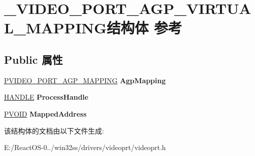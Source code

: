 \hypertarget{struct___v_i_d_e_o___p_o_r_t___a_g_p___v_i_r_t_u_a_l___m_a_p_p_i_n_g}{}\section{\+\_\+\+V\+I\+D\+E\+O\+\_\+\+P\+O\+R\+T\+\_\+\+A\+G\+P\+\_\+\+V\+I\+R\+T\+U\+A\+L\+\_\+\+M\+A\+P\+P\+I\+N\+G结构体 参考}
\label{struct___v_i_d_e_o___p_o_r_t___a_g_p___v_i_r_t_u_a_l___m_a_p_p_i_n_g}
\subsection*{Public 属性}
\begin{DoxyCompactItemize}
\item 
\mbox{\label{struct___v_i_d_e_o___p_o_r_t___a_g_p___v_i_r_t_u_a_l___m_a_p_p_i_n_g_adacc8568ab3f0f2904dcaee8b2c81306}} 
\hyperlink{struct___v_i_d_e_o___p_o_r_t___a_g_p___m_a_p_p_i_n_g}{P\+V\+I\+D\+E\+O\+\_\+\+P\+O\+R\+T\+\_\+\+A\+G\+P\+\_\+\+M\+A\+P\+P\+I\+NG} {\bfseries Agp\+Mapping}
\item 
\mbox{\label{struct___v_i_d_e_o___p_o_r_t___a_g_p___v_i_r_t_u_a_l___m_a_p_p_i_n_g_a73dda024fc28fd2eb9cf172192731f9b}} 
\hyperlink{interfacevoid}{H\+A\+N\+D\+LE} {\bfseries Process\+Handle}
\item 
\mbox{\label{struct___v_i_d_e_o___p_o_r_t___a_g_p___v_i_r_t_u_a_l___m_a_p_p_i_n_g_a55239644fbd054f7590efa9311c572be}} 
\hyperlink{interfacevoid}{P\+V\+O\+ID} {\bfseries Mapped\+Address}
\end{DoxyCompactItemize}


该结构体的文档由以下文件生成\+:\begin{DoxyCompactItemize}
\item 
E\+:/\+React\+O\+S-\/0../win32ss/drivers/videoprt/videoprt.\+h\end{DoxyCompactItemize}
